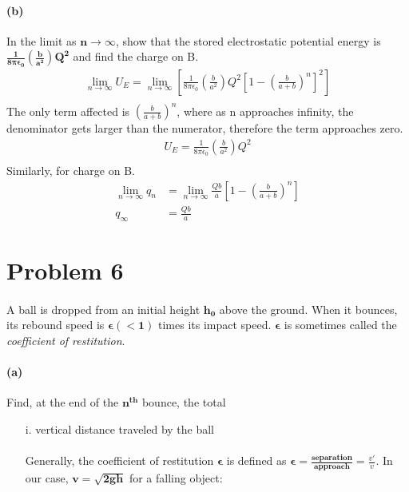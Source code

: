 \documentclass[]{article}
\newcommand{\ita}{\textit}
\begin{document}
{		\paragraph*{(b)} In the limit as $\bm{n \rightarrow \infty}$, show that the stored electrostatic potential energy is $ \bm{ \frac{1}{8\pi \epsilon_0} \left( \frac{b}{a^2} \right) Q^2 } $ and find the charge on B.
			\begin{equation*}
				\begin{split}
					\lim_{n\to\infty} U_E = \lim_{n\to\infty} \left[ \frac{1}{8\pi \epsilon_0} \left( \frac{b}{a^2} \right) Q^2 \left[ 1 - \left( \frac{b}{a + b} \right)^n \right]^2 \right] \\
				\end{split}
			\end{equation*}
			The only term affected is $ \left( \tfrac{b}{a + b} \right)^n $, where as n approaches infinity, the denominator gets larger than the numerator, therefore the term approaches zero.
			\begin{equation*}
				\begin{split}
					U_E = \frac{1}{8\pi \epsilon_0} \left( \frac{b}{a^2} \right) Q^2 \\
				\end{split}
			\end{equation*}
			Similarly, for charge on B.
			\begin{equation*}
				\begin{split}
					\lim_{n\to\infty} q_n &= \lim_{n\to\infty} \frac{Qb}{a} \left[ 1 - \left( \frac{b}{a + b} \right)^n \right] \\
					q_{\infty} &= \frac{Qb}{a}
				\end{split}
			\end{equation*}
			

	\section*{Problem 6}

		\paragraph{} A ball is dropped from an initial height $\bm{h_0}$ above the ground. When it bounces, its rebound speed is $\bm{\epsilon} \left( < \bm{1} \right)$ times its impact speed. $\bm{\epsilon}$ is sometimes called the \ita{coefficient of restitution}.
		
		\paragraph{(a)} Find, at the end of the $\bm{n^{th}}$ bounce, the total
		\begin{enumerate}[label=\roman*,topsep=0pt]
			\item[i.] vertical distance traveled by the ball \\
				\\
				Generally, the coefficient of restitution $\bm{\epsilon}$ is defined as $\bm{\epsilon = \frac{separation}{approach}} = \frac{v'}{v}$. In our case, $ \bm{v = \sqrt{2gh}} $ for a falling object:
				

\end{enumerate}}
\end{document}
